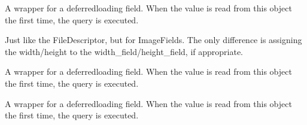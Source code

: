\documentclass[letterpaper,10pt,french]{sphinxmanual}
\begin{document}
\begin{fulllineitems}
\begin{fulllineitems}
\label{\detokenize{main/model:main.models.Etudiant.passer_semestre_suivant}}
\pysigstartsignatures
{}
\pysigstopsignatures
\sphinxAtStartPar
A wrapper for a deferred\sphinxhyphen{}loading field. When the value is read from this
object the first time, the query is executed.

\end{fulllineitems}


\begin{fulllineitems}
\label{\detokenize{main/model:main.models.Etudiant.photo_passport}}
\pysigstartsignatures
{}
\pysigstopsignatures
\sphinxAtStartPar
Just like the FileDescriptor, but for ImageFields. The only difference is
assigning the width/height to the width\_field/height\_field, if appropriate.

\end{fulllineitems}


\begin{fulllineitems}
\label{\detokenize{main/model:main.models.Etudiant.prefecture}}
\pysigstartsignatures
{}
\pysigstopsignatures
\sphinxAtStartPar
A wrapper for a deferred\sphinxhyphen{}loading field. When the value is read from this
object the first time, the query is executed.

\end{fulllineitems}


\begin{fulllineitems}
\label{\detokenize{main/model:main.models.Etudiant.prenom}}
\pysigstartsignatures
{}
\pysigstopsignatures
\sphinxAtStartPar
A wrapper for a deferred\sphinxhyphen{}loading field. When the value is read from this
object the first time, the query is executed.

\end{fulllineitems}


\end{fulllineitems}
\end{document}
